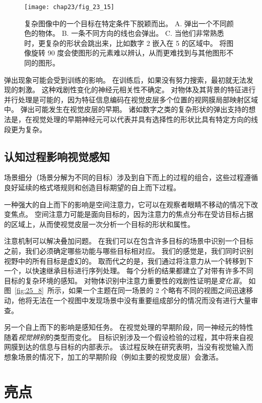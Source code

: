 \begin{figure}[htbp]
	\centering
	\texttt{[image: chap23/fig\_23\_15]}
	\caption{复杂图像中的一个目标在特定条件下脱颖而出。
		A. 弹出一个不同颜色的物体。
		B. 一条不同方向的线也会弹出。
		C. 当他们非常熟悉时，更复杂的形状会跳出来，比如数字 2 嵌入在 5 的区域中。
		将图像旋转 90 度会使图形的元素难以辨认，从而更难找到与其他图形不同的图形\cite{wang1994familiarity}。}
	\label{fig:23_15}
\end{figure}


弹出现象可能会受到训练的影响。
在训练后，如果没有努力搜索，最初就无法发现的刺激。 
这种戏剧性变化的神经元相关性不确定。
对物体及其背景的特征进行并行处理是可能的，因为特征信息编码在视觉皮层多个位置的视网膜局部映射区域中。
弹出可能发生在视觉皮层的早期。
诸如数字之类的复杂形状的弹出支持的想法是，在视觉处理的早期神经元可以代表并具有选择性的形状比具有特定方向的线段更为复杂。



\subsection{认知过程影响视觉感知}

场景细分（场景分解为不同的目标）涉及到自下而上的过程的组合，这些过程遵循良好延续的格式塔规则和创造目标期望的自上而下过程。


一种强大的自上而下的影响是空间注意力，它可以在观察者眼睛不移动的情况下改变焦点。
空间注意力可能是面向目标的，因为注意力的焦点分布在受访目标占据的区域上，从而使视觉皮层一次分析一个目标的形状和属性。


注意机制可以解决叠加问题。
在我们可以在包含许多目标的场景中识别一个目标之前，我们必须确定哪些功能与哪些目标相对应。
我们的感觉是，我们同时识别视野中的所有目标是虚幻的。
取而代之的是，我们通过将注意力从一个转移到下一个，以快速继承目标进行序列处理。
每个分析的结果都建立了对带有许多不同目标的复杂环境的感知。
对物体识别中注意力重要性的戏剧性证明是\textit{变化盲}。
如图~\ref{fig:25_8}~所示，如果一个主题在同一场景的 2 个略有不同的视图之间迅速移动，他将无法在一个视图中发现场景中没有重要组成部分的情况而没有进行大量审查。


另一个自上而下的影响是感知任务。
在视觉处理的早期阶段，同一神经元的特性随着\textit{视觉辨别}的类型而变化。
目标识别涉及一个假设检验的过程，其中将来自视网膜到达的信息与目标的内部表示。
该过程反映在研究表明，当没有视觉输入而想象场景的情况下，加工的早期阶段（例如主要的视觉皮层）会激活。



\section{亮点}

